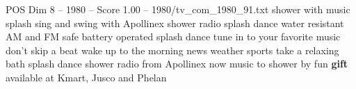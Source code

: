 \begin{textsample}{POS Dim 8 – 1980 – Score 1.00 – 1980/tv\_com\_1980\_91.txt}  \label{ex:f8_pos_043}
shower with music splash sing and swing with Apollinex shower radio splash dance water resistant AM and FM safe battery operated splash dance tune in to your favorite music don't skip a beat wake up to the morning news weather sports take a relaxing bath splash dance shower radio from Apollinex now music to shower by fun \textbf{gift} available at Kmart, Jusco and Phelan

\end{textsample}

